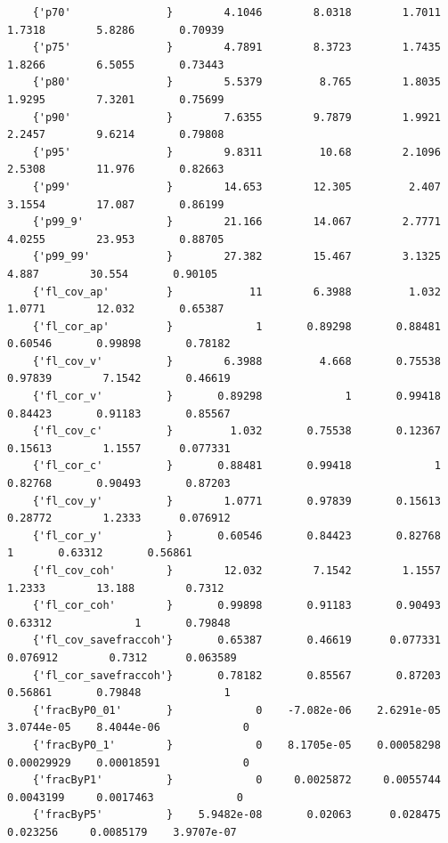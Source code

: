 \documentclass[
]{book}
\begin{document}
\begin{verbatim}
    {'p70'               }        4.1046        8.0318        1.7011        1.7318        5.8286       0.70939 
    {'p75'               }        4.7891        8.3723        1.7435        1.8266        6.5055       0.73443 
    {'p80'               }        5.5379         8.765        1.8035        1.9295        7.3201       0.75699 
    {'p90'               }        7.6355        9.7879        1.9921        2.2457        9.6214       0.79808 
    {'p95'               }        9.8311         10.68        2.1096        2.5308        11.976       0.82663 
    {'p99'               }        14.653        12.305         2.407        3.1554        17.087       0.86199 
    {'p99_9'             }        21.166        14.067        2.7771        4.0255        23.953       0.88705 
    {'p99_99'            }        27.382        15.467        3.1325         4.887        30.554       0.90105 
    {'fl_cov_ap'         }            11        6.3988         1.032        1.0771        12.032       0.65387 
    {'fl_cor_ap'         }             1       0.89298       0.88481       0.60546       0.99898       0.78182 
    {'fl_cov_v'          }        6.3988         4.668       0.75538       0.97839        7.1542       0.46619 
    {'fl_cor_v'          }       0.89298             1       0.99418       0.84423       0.91183       0.85567 
    {'fl_cov_c'          }         1.032       0.75538       0.12367       0.15613        1.1557      0.077331 
    {'fl_cor_c'          }       0.88481       0.99418             1       0.82768       0.90493       0.87203 
    {'fl_cov_y'          }        1.0771       0.97839       0.15613       0.28772        1.2333      0.076912 
    {'fl_cor_y'          }       0.60546       0.84423       0.82768             1       0.63312       0.56861 
    {'fl_cov_coh'        }        12.032        7.1542        1.1557        1.2333        13.188        0.7312 
    {'fl_cor_coh'        }       0.99898       0.91183       0.90493       0.63312             1       0.79848 
    {'fl_cov_savefraccoh'}       0.65387       0.46619      0.077331      0.076912        0.7312      0.063589 
    {'fl_cor_savefraccoh'}       0.78182       0.85567       0.87203       0.56861       0.79848             1 
    {'fracByP0_01'       }             0    -7.082e-06    2.6291e-05    3.0744e-05    8.4044e-06             0 
    {'fracByP0_1'        }             0    8.1705e-05    0.00058298    0.00029929    0.00018591             0 
    {'fracByP1'          }             0     0.0025872     0.0055744     0.0043199     0.0017463             0 
    {'fracByP5'          }    5.9482e-08       0.02063      0.028475      0.023256     0.0085179    3.9707e-07 

\end{verbatim}
\end{document}
